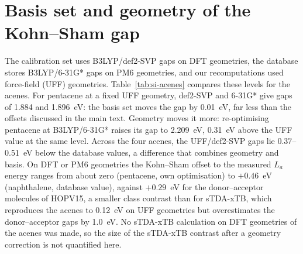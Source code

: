 \documentclass[11pt]{article}
\begin{document}
\section{Basis set and geometry of the Kohn--Sham gap}\label{sec:basis}
The calibration set uses B3LYP/def2-SVP gaps on DFT geometries, the database stores B3LYP/6-31G* gaps on PM6 geometries,
and our recomputations used force-field (UFF) geometries. Table~\ref{tab:si-acenes} compares these levels for the
acenes. For pentacene at a fixed UFF geometry, def2-SVP and 6-31G* give gaps of 1.884 and \qty{1.896}{eV}: the basis
set moves the gap by \qty{0.01}{eV}, far less than the offsets discussed in the main text. Geometry moves it more:
re-optimising pentacene at B3LYP/6-31G* raises its gap to \qty{2.209}{eV}, \qty{0.31}{eV} above the UFF value at the same
level. Across the four acenes, the UFF/def2-SVP gaps lie 0.37--\qty{0.51}{eV} below the database values, a difference
that combines geometry and basis. On DFT or PM6
geometries the Kohn--Sham offset to the measured $L_a$ energy ranges from about zero (pentacene, own optimisation) to
$+0.46$~eV (naphthalene, database value), against $+0.29$~eV for the donor--acceptor molecules of HOPV15, a smaller
class contrast than for sTDA-xTB, which reproduces the acenes to \qty{0.12}{eV} on UFF geometries but overestimates the
donor--acceptor gaps by \qty{1.0}{eV}. No sTDA-xTB calculation on DFT geometries of the acenes was made, so the size of
the sTDA-xTB contrast after a geometry correction is not quantified here.
\begin{table}[h]
\centering
\caption{Kohn--Sham gaps of four acenes [eV]. Experimental values: midpoints of the measured lowest bright ($L_a$)
excitation energies (Malloci et al., 2007). Offset: Kohn--Sham gap minus experiment.}
\label{tab:si-acenes}
\end{table}
\end{document}

